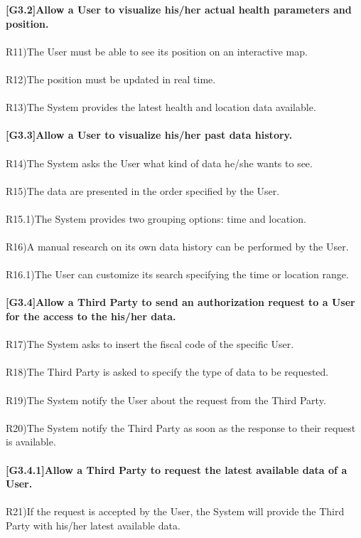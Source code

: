 \textbf{ [G3.2]Allow a User to visualize his/her actual health parameters and position.} \\ \\
R11)The User must be able to see its position on an interactive map. \\ \\
R12)The position must be updated in real time. \\ \\
R13)The System provides the latest health and location data available. \\ \\

\textbf{[G3.3]Allow a User to visualize his/her past data history.} \\ \\
R14)The System asks the User what kind of data he/she wants to see. \\ \\
R15)The data are presented in the order specified by the User.  \\ \\
R15.1)The System provides two grouping options: time and location. \\ \\
R16)A manual research on its own data history can be performed by the User. \\ \\
R16.1)The User can customize its search specifying the time or location range. \\ \\ 

\textbf{[G3.4]Allow a Third Party to send an authorization request to a User for the access to the his/her data.} \\ \\
R17)The System asks to insert the fiscal code of the specific User. \\ \\
R18)The Third Party is asked to specify the type of data to be requested.\\ \\ 
R19)The System notify the User about the request from the Third Party.\\ \\
R20)The System notify the Third Party as soon as the response to their request is available. \\ \\

\textbf{[G3.4.1]Allow a Third Party to request the latest available data of a User.} \\ \\
R21)If the request is accepted by the User, the System will provide the Third Party with his/her latest available data. \\ \\ 

